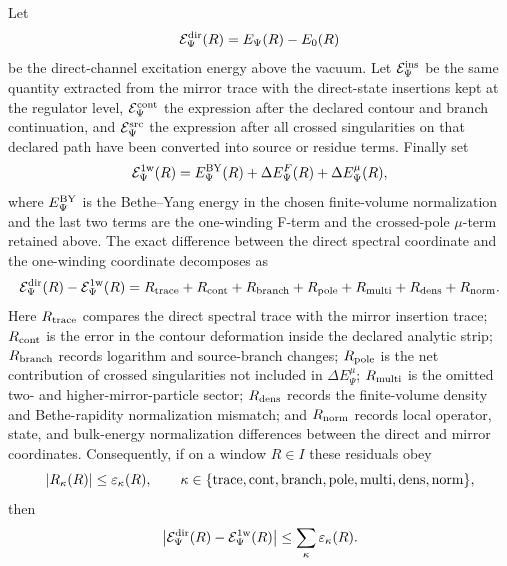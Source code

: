 \begin{remark}
\label{rem:excited-state-continuation-proof-obligation-map}
Let
\[
  \mathcal E_\Psi^{\rm dir}(R)=E_\Psi(R)-E_0(R)
\]
be the direct-channel excitation energy above the vacuum.  Let
\(\mathcal E_\Psi^{\rm ins}\) be the same quantity extracted from the mirror
trace with the direct-state insertions kept at the regulator level,
\(\mathcal E_\Psi^{\rm cont}\) the expression after the declared contour and
branch continuation, and \(\mathcal E_\Psi^{\rm src}\) the expression after
all crossed singularities on that declared path have been converted into
source or residue terms.  Finally set
\begin{equation}
  \mathcal E_\Psi^{1{\rm w}}(R)
  =
  E_\Psi^{\rm BY}(R)
  +
  \Delta E_\Psi^{F}(R)
  +
  \Delta E_\Psi^{\mu}(R),
  \label{eq:excited-state-one-winding-coordinate}
\end{equation}
where \(E_\Psi^{\rm BY}\) is the Bethe--Yang energy in the chosen
finite-volume normalization and the last two terms are the one-winding
F-term and the crossed-pole \(\mu\)-term retained above.  The exact
difference between the direct spectral coordinate and the one-winding
coordinate decomposes as
\begin{equation}
  \mathcal E_\Psi^{\rm dir}(R)-\mathcal E_\Psi^{1{\rm w}}(R)
  =
  R_{\rm trace}
  +
  R_{\rm cont}
  +
  R_{\rm branch}
  +
  R_{\rm pole}
  +
  R_{\rm multi}
  +
  R_{\rm dens}
  +
  R_{\rm norm}.
  \label{eq:excited-state-continuation-residual-budget}
\end{equation}
Here \(R_{\rm trace}\) compares the direct spectral trace with the mirror
insertion trace; \(R_{\rm cont}\) is the error in the contour deformation
inside the declared analytic strip; \(R_{\rm branch}\) records logarithm and
source-branch changes; \(R_{\rm pole}\) is the net contribution of crossed
singularities not included in \(\Delta E_\Psi^\mu\); \(R_{\rm multi}\) is the
omitted two- and higher-mirror-particle sector; \(R_{\rm dens}\) records the
finite-volume density and Bethe-rapidity normalization mismatch; and
\(R_{\rm norm}\) records local operator, state, and bulk-energy normalization
differences between the direct and mirror coordinates.  Consequently, if on
a window \(R\in I\) these residuals obey
\[
  |R_\kappa(R)|\le \varepsilon_\kappa(R),
  \qquad
  \kappa\in\{
  {\rm trace},{\rm cont},{\rm branch},{\rm pole},
  {\rm multi},{\rm dens},{\rm norm}\},
\]
then
\begin{equation}
  \left|
  \mathcal E_\Psi^{\rm dir}(R)-\mathcal E_\Psi^{1{\rm w}}(R)
  \right|
  \le
  \sum_\kappa\varepsilon_\kappa(R).
  \label{eq:excited-state-continuation-residual-bound}
\end{equation}
\end{remark}

